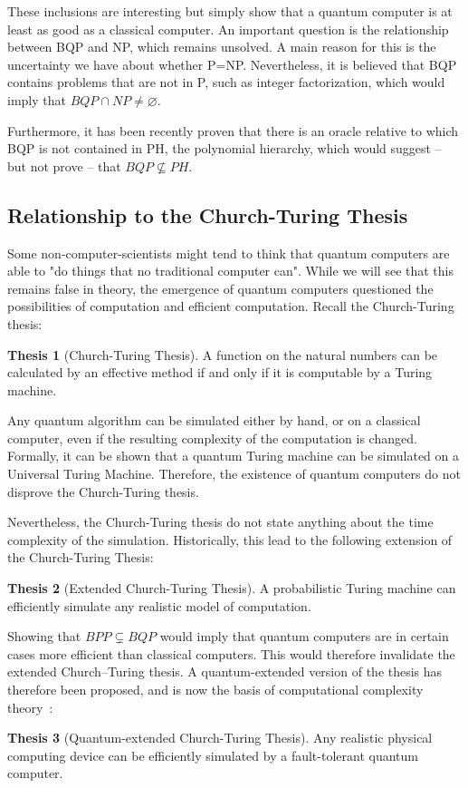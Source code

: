 \documentclass[12pt,a4paper]{article}
\theoremstyle{plain}
\theoremstyle{definition}
\newtheorem*{thesis}{Thesis}
\begin{document}
These inclusions are interesting but simply show that a quantum computer is at least as good as a classical computer. An important question is the relationship between BQP and NP, which remains unsolved. A main reason for this is the uncertainty we have about whether P=NP. Nevertheless, it is believed that BQP contains problems that are not in P, such as integer factorization, which would imply that $BQP\cap NP \neq \varnothing$.

Furthermore, it has been recently proven\cite{oracle-bqp-ph} that there is an oracle relative to which BQP is not contained in PH, the polynomial hierarchy, which would suggest -- but not prove -- that $BQP \nsubseteq PH$.


\subsection{Relationship to the Church-Turing Thesis}
Some non-computer-scientists might tend to think that quantum computers are able to "do things that no traditional computer can". While we will see that this remains false in theory, the emergence of quantum computers questioned the possibilities of computation and efficient computation. Recall the Church-Turing thesis:
\begin{thesis}[Church-Turing Thesis]
    A function on the natural numbers can be calculated by an effective method if and only if it is computable by a Turing machine.
\end{thesis}

Any quantum algorithm can be simulated either by hand, or on a classical computer, even if the resulting complexity of the computation is changed. Formally, it can be shown that a quantum Turing machine can be simulated on a Universal Turing Machine. Therefore, the existence of quantum computers do not disprove the Church-Turing thesis.

Nevertheless, the Church-Turing thesis do not state anything about the time complexity of the simulation. Historically, this lead to the following extension of the Church-Turing Thesis:
\begin{thesis}[Extended Church-Turing Thesis]
    A probabilistic Turing machine can efficiently simulate any realistic model of computation.
\end{thesis}

Showing that $BPP \varsubsetneq BQP$ would imply that quantum computers are in certain cases more efficient than classical computers. This would therefore invalidate the extended Church–Turing thesis. A quantum-extended version of the thesis has therefore been proposed, and is now the basis of computational complexity theory \cite{qc-theory-bernstein}:
\begin{thesis}[Quantum-extended Church-Turing Thesis]
    Any realistic physical computing device can be efficiently simulated by a fault-tolerant quantum computer.\cite{quantum-applied}
\end{thesis}
\end{document}
